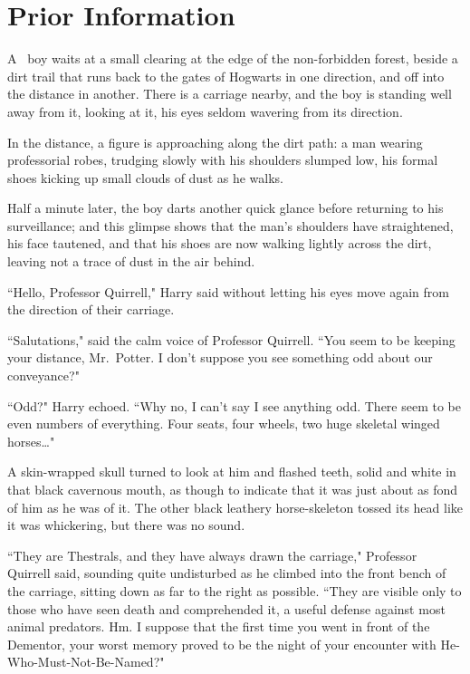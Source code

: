 \chapter{Prior Information}

\lettrine{A}{~} boy waits at a small clearing at the edge of the non-forbidden forest, beside a dirt trail that runs back to the gates of Hogwarts in one direction, and off into the distance in another. There is a carriage nearby, and the boy is standing well away from it, looking at it, his eyes seldom wavering from its direction.

In the distance, a figure is approaching along the dirt path: a man wearing professorial robes, trudging slowly with his shoulders slumped low, his formal shoes kicking up small clouds of dust as he walks.

Half a minute later, the boy darts another quick glance before returning to his surveillance; and this glimpse shows that the man's shoulders have straightened, his face tautened, and that his shoes are now walking lightly across the dirt, leaving not a trace of dust in the air behind.

``Hello, Professor Quirrell," Harry said without letting his eyes move again from the direction of their carriage.

``Salutations," said the calm voice of Professor Quirrell. ``You seem to be keeping your distance, Mr.~Potter. I don't suppose you see something odd about our conveyance?"

``Odd?" Harry echoed. ``Why no, I can't say I see anything odd. There seem to be even numbers of everything. Four seats, four wheels, two huge skeletal winged horses{\ldots}"

A skin-wrapped skull turned to look at him and flashed teeth, solid and white in that black cavernous mouth, as though to indicate that it was just about as fond of him as he was of it. The other black leathery horse-skeleton tossed its head like it was whickering, but there was no sound.

``They are Thestrals, and they have always drawn the carriage," Professor Quirrell said, sounding quite undisturbed as he climbed into the front bench of the carriage, sitting down as far to the right as possible. ``They are visible only to those who have seen death and comprehended it, a useful defense against most animal predators. Hm. I suppose that the first time you went in front of the Dementor, your worst memory proved to be the night of your encounter with He-Who-Must-Not-Be-Named?"

